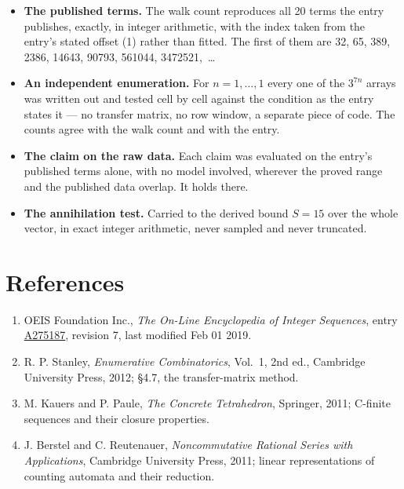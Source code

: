 \documentclass[11pt]{article}
\theoremstyle{definition}
\begin{document}
\begin{itemize}

\item {\bfseries The published terms.} The walk count reproduces all 20 terms the entry publishes, exactly, in integer arithmetic, with the index taken from the entry's stated offset (1) rather than fitted. The first of them are 32, 65, 389, 2386, 14643, 90793, 561044, 3472521,~\dots

\item {\bfseries An independent enumeration.} For $n = 1,\dots,1$ every one of the $3^{7n}$ arrays was written out and tested cell by cell against the condition as the entry states it --- no transfer matrix, no row window, a separate piece of code. The counts agree with the walk count and with the entry.

\item {\bfseries The claim on the raw data.} Each claim was evaluated on the entry's published terms alone, with no model involved, wherever the proved range and the published data overlap. It holds there.

\item {\bfseries The annihilation test.} Carried to the derived bound $S = 15$ over the whole vector, in exact integer arithmetic, never sampled and never truncated.

\end{itemize}

\section{References}

\begin{enumerate}

\item OEIS Foundation Inc., \emph{The On-Line Encyclopedia of Integer Sequences}, entry \href{https://oeis.org/A275187}{A275187}, revision 7, last modified Feb 01 2019.

\item R. P. Stanley, \emph{Enumerative Combinatorics}, Vol.~1, 2nd ed., Cambridge University Press, 2012; \S4.7, the transfer-matrix method.

\item M. Kauers and P. Paule, \emph{The Concrete Tetrahedron}, Springer, 2011; C-finite sequences and their closure properties.

\item J. Berstel and C. Reutenauer, \emph{Noncommutative Rational Series with Applications}, Cambridge University Press, 2011; linear representations of counting automata and their reduction.

\end{enumerate}
\end{document}
